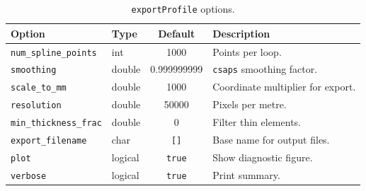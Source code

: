 \begin{table}[H]
\centering
\caption{\texttt{exportProfile} options.}
\begin{tabularx}{\textwidth}{llcX}
\toprule
\textbf{Option} & \textbf{Type} & \textbf{Default} & \textbf{Description} \\
\midrule
\texttt{num\_spline\_points}  & int    & 1000          & Points per loop. \\
\texttt{smoothing}            & double & 0.999999999   & \texttt{csaps} smoothing factor. \\
\texttt{scale\_to\_mm}        & double & 1000          & Coordinate multiplier for export. \\
\texttt{resolution}           & double & 50000         & Pixels per metre. \\
\texttt{min\_thickness\_frac} & double & 0             & Filter thin elements. \\
\texttt{export\_filename}     & char   & \texttt{[]}   & Base name for output files. \\
\texttt{plot}                 & logical& \texttt{true}  & Show diagnostic figure. \\
\texttt{verbose}              & logical& \texttt{true}  & Print summary. \\
\bottomrule
\end{tabularx}
\end{table}